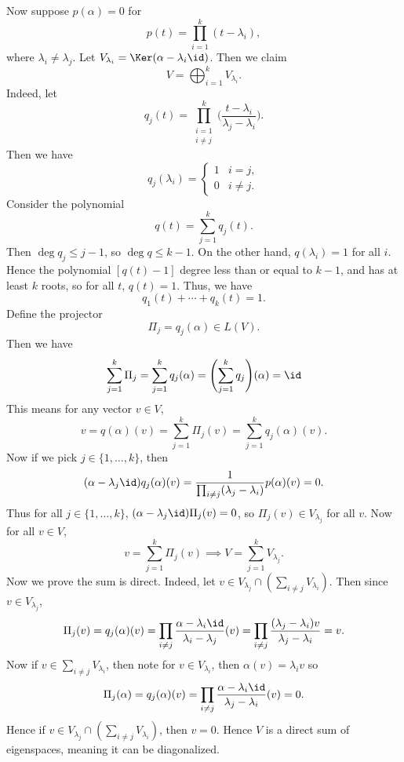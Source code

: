 \documentclass[12pt]{article}
\begin{document}
\begin{proofbox}
	Now suppose $p(\alpha) = 0$ for 
	\[
		p(t) = \prod_{i = 1}^{k}(t - \lambda_i)
	,\]
	where $\lambda_i \neq \lambda_j$. Let $V_{\lambda_i} = \Ker(\alpha - \lambda_i \id)$. Then we claim
	\[
	V = \bigoplus_{i = 1}^{k} V_{\lambda_i}
	.\]
	Indeed, let
	\[
		q_j(t) = \prod_{\substack{i = 1 \\i \neq j}}^{k} \biggl( \frac{t - \lambda_i}{\lambda_j- \lambda_i} \biggr)
	.\]
	Then we have
	\[
		q_j(\lambda_i) =
		\begin{cases}
			1 & i = j, \\
			0 & i \neq j.
		\end{cases}
	\]
	Consider the polynomial
	\[
		q(t) = \sum_{j = 1}^{k} q_j(t)
	.\]
	Then $\deg q_j \leq j-1$, so $\deg q \leq k-1$. On the other hand, $q(\lambda_i) = 1$ for all $i$. Hence the polynomial $[q(t) - 1]$ degree less than or equal to $k-1$, and has at least $k$ roots, so for all $t$, $q(t) = 1$. Thus, we have
	\[
		q_1(t) + \cdots + q_k(t) = 1
	.\]
	Define the projector
	\[
		\Pi_j = q_j(\alpha) \in L(V)
	.\]
	Then we have
	\begin{align*}
		\sum_{j = 1}^{k} \Pi_j = \sum_{j = 1}^{k} q_j(\alpha) = \Biggl( \sum_{j = 1}^{k} q_j \Biggr) (\alpha) = \id
	\end{align*}
	This means for any vector $v \in V$,
	\[
		v = q(\alpha)(v) = \sum_{j = 1}^{k} \Pi_j(v) = \sum_{j = 1}^{k} q_j(\alpha)(v)
	.\]
	Now if we pick $j \in \{1, \ldots, k\}$, then
	 \[
		 (\alpha - \lambda_j \id) q_j(\alpha)(v) = \frac{1}{\prod_{i \neq j}(\lambda_j - \lambda_i)} p(\alpha)(v) = 0
	.\]
	Thus for all $j \in \{1, \ldots, k\}$, $(\alpha - \lambda_j \id)\Pi_j(v) = 0$, so $\Pi_j(v) \in V_{\lambda_j}$ for all $v$. Now for all $v \in V$,
	\[
		v = \sum_{j = 1}^{k} \Pi_j(v) \implies V = \sum_{j = 1}^{k}V_{\lambda_j}.
	\]
	Now we prove the sum is direct. Indeed, let $v \in V_{\lambda_j} \cap (\sum_{i \neq j} V_{\lambda_i})$. Then since $v \in V_{\lambda_j}$,
	\[
		\Pi_j(v) = q_j(\alpha)(v) = \prod_{i \neq j} \frac{\alpha - \lambda_i \id}{\lambda_i - \lambda_j} (v) = \prod_{i \neq j} \frac{(\lambda_j - \lambda_i)v}{\lambda_j - \lambda_i} = v
	.\]
	Now if $v \in \sum_{i \neq j} V_{\lambda_i}$, then note for $v \in V_{\lambda_i}$, then $\alpha(v) = \lambda_i v$ so
	\[
		\Pi_j(\alpha) = q_j(\alpha)(v) = \prod_{i \neq j} \frac{\alpha - \lambda_i \id}{\lambda_j - \lambda_i}(v) = 0
	.\]
	Hence if $v \in V_{\lambda_j}\cap (\sum_{i \neq j} V_{\lambda_i})$, then $v = 0$. Hence $V$ is a direct sum of eigenspaces, meaning it can be diagonalized.
\end{proofbox}
\end{document}
